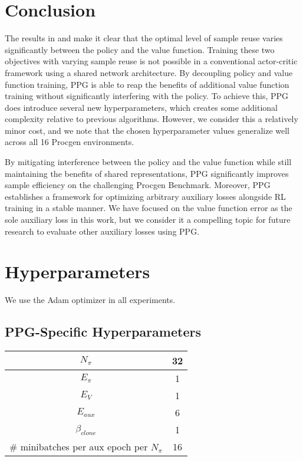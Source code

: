 \documentclass{article}
\newcommand{\changeurlcolor}[1]{\hypersetup{urlcolor=#1}}
\begin{document}
\section{Conclusion}

The results in  and  make it clear that the optimal level of sample reuse varies significantly between the policy and the value function. Training these two objectives with varying sample reuse is not possible in a conventional actor-critic framework using a shared network architecture. By decoupling policy and value function training, PPG is able to reap the benefits of additional value function training without significantly interfering with the policy. To achieve this, PPG does introduce several new hyperparameters, which creates some additional complexity relative to previous algorithms. However, we consider this a relatively minor cost, and we note that the chosen hyperparameter values generalize well across all 16 Procgen environments.

By mitigating interference between the policy and the value function while still maintaining the benefits of shared representations, PPG significantly improves sample efficiency on the challenging Procgen Benchmark. Moreover, PPG establishes a framework for optimizing arbitrary auxiliary losses alongside RL training in a stable manner. We have focused on the value function error as the sole auxiliary loss in this work, but we consider it a compelling topic for future research to evaluate other auxiliary losses using PPG.

\changeurlcolor{black}



\changeurlcolor{blue}

\appendix

\clearpage

\section{Hyperparameters} \label{appendix:hyperparameters}

We use the Adam optimizer \citep{kingma2014adam} in all experiments.

\subsection{PPG-Specific Hyperparameters}

\begin{center}
 \begin{tabular}{||c c||} 
 \hline
 $N_{\pi}$ & 32 \\ 
 \hline
 $E_{\pi}$ & 1 \\
 \hline
 $E_V$ & 1 \\
 \hline
 $E_{aux}$ & 6 \\ 
 \hline
 $\beta_{clone}$ & 1 \\
 \hline
 \# minibatches per aux epoch per $N_{\pi}$ & 16 \\
 \hline
\end{tabular}
\end{center}
\end{document}
